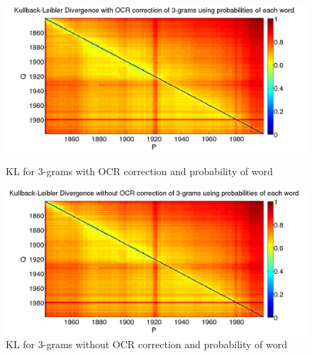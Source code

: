 \begin{figure}[H]
    \begin{minipage}[b]{0.48\linewidth}
        \includegraphics[scale=0.15]{Pictures/kullback-leibler/KL_3-grams_with_correction_proba.jpg}
        \caption{KL for 3-grams with OCR correction and probability of word}
        \label{KL-PC3}
    \end{minipage}\hfill
    \begin{minipage}[b]{0.5\linewidth}
        \includegraphics[scale=0.15]{Pictures/kullback-leibler/KL_3-grams_without_correction_proba.jpg}
        \caption{KL for 3-grams without OCR correction and probability of word}
        \label{KL-PN3}
    \end{minipage}\hfill
\end{figure}

